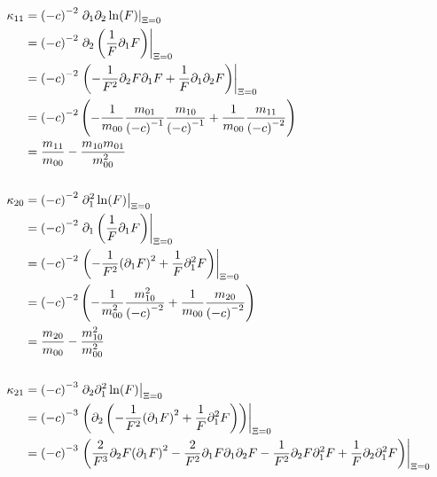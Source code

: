 \documentclass{article}
\begin{document}
\begin{align*}
  \phantom{\kappa_{00}}
  &\begin{aligned}
  \nonumber
    \mathllap{\kappa_{11}} & = {(-c)}^{-2} \left.\partial_1 \partial_2 \ln(F) \right|_{\Xi = 0} \\
    & = {(-c)}^{-2} \left.\partial_2 \left( \frac{1}{F} \partial_1 F \right) \right|_{\Xi = 0} \\
    & = {(-c)}^{-2} \left.\left( -\frac{1}{F^2} \partial_2 F \partial_1 F + \frac{1}{F} \partial_1\partial_2 F \right) \right|_{\Xi = 0} \\
    & = {(-c)}^{-2} \left(
      - \frac{1}{m_{00}} \frac{m_{01}}{{(-c)}^{-1}} \frac{m_{10}}{{(-c)}^{-1}}
      + \frac{1}{m_{00}} \frac{m_{11}}{{(-c)}^{-2}}
      \right) \\
    & = \frac{m_{11}}{m_{00}} - \frac{m_{10}m_{01}}{m_{00}^2}
  \end{aligned} \\
  \\
  &\begin{aligned}
  \nonumber
  \mathllap{\kappa_{20}} & = {(-c)}^{-2} \left.\partial_1^2 \ln(F) \right|_{\Xi = 0} \\
  & = {(-c)}^{-2} \left.\partial_1 \left( \frac{1}{F} \partial_1 F \right) \right|_{\Xi = 0} \\
  & = {(-c)}^{-2} \left.\left( -\frac{1}{F^2} {(\partial_1 F)}^2 + \frac{1}{F} \partial_1^2 F \right) \right|_{\Xi = 0} \\
  & = {(-c)}^{-2} \left(
    - \frac{1}{m_{00}^2} \frac{m_{10}^2}{{(-c)}^{-2}}
    + \frac{1}{m_{00}} \frac{m_{20}}{{(-c)}^{-2}}
    \right)\\
  & = \frac{m_{20}}{m_{00}} - \frac{m_{10}^2}{m_{00}^2}
  \end{aligned} \\
  \\
  &\begin{aligned}
  \nonumber
  \mathllap{\kappa_{21}} & = {(-c)}^{-3} \left. \partial_2 \partial_1^2 \ln(F) \right|_{\Xi = 0} \\
  & = {(-c)}^{-3} \left.\left(\partial_2\left( -\frac{1}{F^2} {(\partial_1 F)}^2 + \frac{1}{F} \partial_1^2 F \right)\right) \right|_{\Xi = 0} \\
  & = {(-c)}^{-3} \left.\left(
      \frac{2}{F^3} \partial_2 F {(\partial_1 F)}^2
    - \frac{2}{F^2} \partial_1 F \partial_1 \partial_2 F
    - \frac{1}{F^2} \partial_2 F \partial_1^2 F
    + \frac{1}{F} \partial_2 \partial_1^2 F
    \right)\right|_{\Xi = 0}\\

\end{aligned}
\end{align*}
\end{document}

